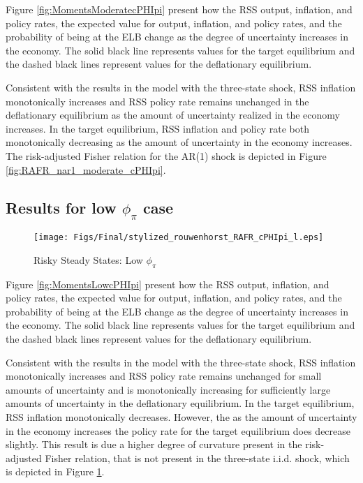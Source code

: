 \documentclass[11pt]{article}
\begin{document}
	Figure \ref{fig:MomentsModeratecPHIpi} present how the RSS output, inflation, and policy rates, the expected value for output, inflation, and policy rates, and the probability of being at the ELB change as the degree of uncertainty increases in the economy. The solid black line represents values for the target equilibrium and the dashed black lines represent values for the deflationary equilibrium. 
	
	Consistent with the results in the model with the three-state shock, RSS inflation monotonically increases and RSS policy rate remains unchanged in the deflationary equilibrium as the amount of uncertainty realized in the economy increases. In the target equilibrium, RSS inflation and policy rate both monotonically decreasing as the amount of uncertainty in the economy increases. The risk-adjusted Fisher relation for the AR(1) shock is depicted in Figure \ref{fig:RAFR_nar1_moderate_cPHIpi}. %
	
	\subsection{Results for low $\phi_{\pi}$ case}	
	
	\begin{figure}[h]  %
		\begin{center}
			\caption{Risky Steady States: Low $\phi_{\pi}$}
			\texttt{[image: Figs/Final/stylized\_rouwenhorst\_RAFR\_cPHIpi\_l.eps]}
			\label{fig:RAFR_nar1_low_cPHIpi}
		\end{center}
	\end{figure}
	
	Figure \ref{fig:MomentsLowcPHIpi} present how the RSS output, inflation, and policy rates, the expected value for output, inflation, and policy rates, and the probability of being at the ELB change as the degree of uncertainty increases in the economy. The solid black line represents values for the target equilibrium and the dashed black lines represent values for the deflationary equilibrium.
	
	Consistent with the results in the model with the three-state shock, RSS inflation monotonically increases and RSS policy rate remains unchanged for small amounts of uncertainty and is monotonically increasing for sufficiently large amounts of uncertainty in the deflationary equilibrium. In the target equilibrium, RSS inflation monotonically decreases. However, the as the amount of uncertainty in the economy increases the policy rate for the target equilibrium does decrease slightly. This result is due a higher degree of curvature present in the risk-adjusted Fisher relation, that is not present in the three-state i.i.d. shock, which is depicted in Figure \ref{fig:RAFR_nar1_low_cPHIpi}. %
	
\end{document}
